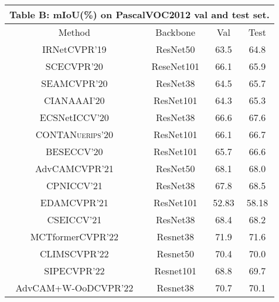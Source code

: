 \documentclass[runningheads]{styles/llncs}
\begin{document}
\begin{minipage}[t]{\textwidth}
\begin{minipage}[b]{0.499\textwidth}
{     }\end{minipage}
\hfill
 \begin{minipage}[b]{0.495\textwidth}\label{tab:Deeplab}
   \centering
         \resizebox{0.99\textwidth}{!}
         {\begin{tabular}{|c | c | c | c | }
          \multicolumn{4}{c}{{\bf Table B}: mIoU(\%) on PascalVOC2012 val and test set.}\\
              \hline
              \rowcolor[gray]{.85}
              Method &  Backbone &      Val & Test \\ \hline\hline
             IRNet\cite{ahn2019weakly}\tiny{\textsc{CVPR'19} } & ResNet50 & 63.5 & 64.8\\
             SCE\cite{chang2020weakly}\tiny{\textsc{CVPR'20}} & ReseNet101 & 66.1 & 65.9\\
             SEAM\cite{wang2020self}\tiny{\textsc{CVPR'20} } &  ResNet38 & 64.5 & 65.7  \\
             CIAN\cite{Fan2020CIANCA}\tiny{\textsc{AAAI'20}} & ResNet101 &  64.3 & 65.3 \\ 
             ECSNet\cite{sun2021ecs}\tiny{\textsc{ICCV'20}} & ResNet38 &  66.6 & 67.6 \\
             CONTA\cite{dong_2020_conta}\tiny{\textsc{Nuerips'20}} &ResNet101 &66.1 & 66.7\\
             BES\cite{chen2020weakly}\tiny{\textsc{ECCV'20}} &ResNet101 &65.7 & 66.6\\
             AdvCAM\cite{lee2021anti}\tiny{\textsc{CVPR'21} } & ResNet50 & 68.1 &  68.0 \\ 
             CPN\cite{zhang2021complementary}\tiny{\textsc{ICCV'21} } & ResNet38 &  67.8 & 68.5 \\
             EDAM\cite{wu2021embedded}\tiny{\textsc{CVPR'21} } &  ResNet101 &  52.83 &  58.18 \\
             CSE\cite{kweon2021unlocking}\tiny{\textsc{ICCV'21} } & ResNet38 &68.4 & 68.2\\
             MCTformer\cite{xu2022multi}\tiny{\textsc{CVPR'22} } &  Resnet38 &  71.9 & 71.6 \\
             CLIMS\cite{xie2022clims}\tiny{\textsc{CVPR'22} } & Resnet50 &  70.4 &  70.0\\
             SIPE\cite{chen2022self}\tiny{\textsc{CVPR'22} } & Resnet101 &  68.8 & 69.7\\
             AdvCAM+W-OoD\cite{lee2022weakly}\tiny{\textsc{CVPR'22} } & Resnet38 &  70.7 & 70.1\\
            \hline

\end{tabular}}
\end{minipage}
\end{minipage}
\end{document}
